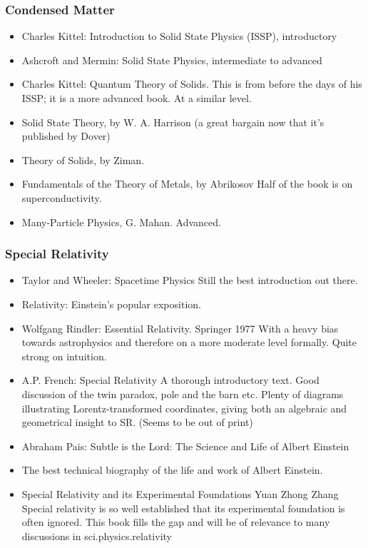 \documentclass[10pt,a4paper]{book}
\theoremstyle{definition}
\begin{document}
\subsubsection{Condensed Matter}

\begin{itemize}
\item  Charles Kittel: Introduction to Solid State Physics (ISSP),
introductory
\item Ashcroft and Mermin: Solid State Physics,
intermediate to advanced
\item Charles Kittel: Quantum Theory of Solids.
This is from before the days of his ISSP; it is a more advanced book.  At a similar level.
\item Solid State Theory, by W. A. Harrison
(a great bargain now that it's published by Dover)
\item Theory of Solids, by Ziman.
\item Fundamentals of the Theory of Metals, by Abrikosov
Half of the book is on superconductivity.
\item Many-Particle Physics, G. Mahan.
Advanced.
\end{itemize}


\subsubsection{Special Relativity}

\begin{itemize}
\item Taylor and Wheeler: Spacetime Physics Still the best introduction out there.
\item Relativity: Einstein's popular exposition.
\item Wolfgang Rindler: Essential Relativity.  Springer 1977
With a heavy bias towards astrophysics and therefore on a more moderate level formally.  Quite strong on intuition.
\item A.P. French: Special Relativity
A thorough introductory text.  Good discussion of the twin paradox, pole and the barn etc.  Plenty of diagrams illustrating Lorentz-transformed coordinates, giving both an algebraic and geometrical insight to SR.  (Seems to be out of print)
\item Abraham Pais: Subtle is the Lord: The Science and Life of Albert Einstein
\item The best technical biography of the life and work of Albert Einstein.
\item Special Relativity and its Experimental Foundations Yuan Zhong Zhang
Special relativity is so well established that its experimental foundation is often ignored.  This book fills the gap and will be of relevance to many discussions in sci.physics.relativity
\end{itemize}
\end{document}
